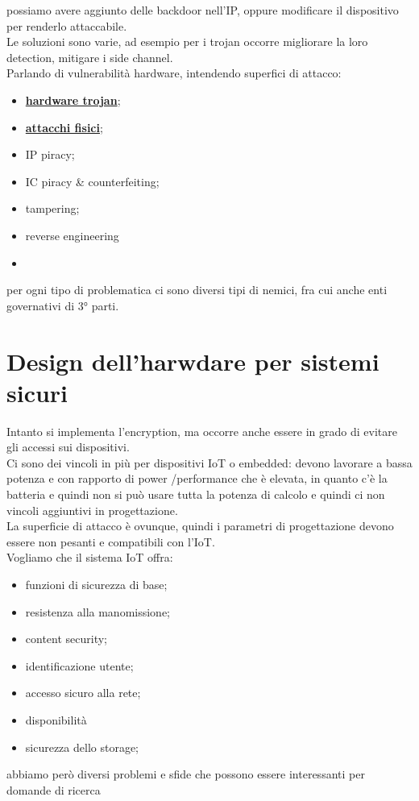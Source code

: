 \documentclass[oneside, 12pt]{extbook}
\begin{document}
possiamo avere aggiunto delle backdoor nell'IP, oppure modificare il dispositivo per renderlo attaccabile.
\\Le soluzioni sono varie, ad esempio per i trojan occorre migliorare la loro detection, mitigare i side channel.\\Parlando di vulnerabilità hardware, intendendo superfici di attacco:
\begin{itemize}
	\item \underline{\textbf{hardware trojan}};
	\item \underline{\textbf{attacchi fisici}};
	\item IP piracy;
	\item IC piracy \& counterfeiting;
	\item tampering;
	\item reverse engineering
	\item 
\end{itemize}
per ogni tipo di problematica ci sono diversi tipi di nemici, fra cui anche enti governativi di 3° parti.

\section{Design dell'harwdare per sistemi sicuri}
Intanto si implementa l'encryption, ma occorre anche essere in grado di evitare gli accessi sui dispositivi.
\\Ci sono dei vincoli in più per dispositivi IoT o embedded: devono lavorare a bassa potenza e con rapporto di power /performance che è elevata, in quanto c'è la batteria e quindi non si può usare tutta la potenza di calcolo e quindi ci non vincoli aggiuntivi in progettazione.
\\La superficie di attacco è ovunque, quindi i parametri di progettazione devono essere non pesanti e compatibili con l'IoT.
\\Vogliamo che il sistema IoT offra: 
\begin{itemize}
	\item funzioni di sicurezza di base;
	\item resistenza alla manomissione;
	\item content security;
	\item identificazione utente;
	\item accesso sicuro alla rete;
	\item disponibilità
	\item sicurezza dello storage;
\end{itemize}
abbiamo però diversi problemi e sfide che possono essere interessanti per domande di ricerca 
\end{document}
